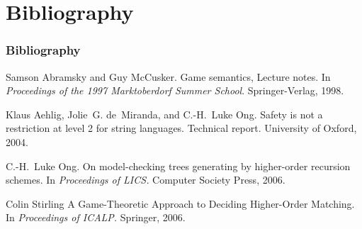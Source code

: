 \section{Bibliography}
\begin{frame} \frametitle<presentation>{Bibliography}

  \begin{thebibliography}{10}
  \beamertemplatearticlebibitems
    Samson Abramsky and Guy McCusker.
    \newblock Game semantics, Lecture notes.
    \newblock In {\em Proceedings of the 1997 Marktoberdorf Summer School}. Springer-Verlag, 1998.

    Klaus Aehlig, Jolie~G. de~Miranda, and C.-H.~Luke Ong.
    \newblock Safety is not a restriction at level 2 for string languages.
    \newblock Technical report. University of Oxford, 2004.

    C.-H.~Luke Ong.
    \newblock On model-checking trees generating by higher-order recursion schemes.
    \newblock In {\em Proceedings of LICS.} Computer Society Press, 2006.
    
    Colin Stirling
    \newblock A Game-Theoretic Approach to Deciding Higher-Order Matching.
    \newblock In {\em Proceedings of ICALP.} Springer, 2006.

  \end{thebibliography}
\end{frame}



